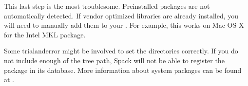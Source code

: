 \documentclass[letterpaper,10pt,english]{sphinxmanual}
\begin{document}
\begin{sphinxVerbatim}[commandchars=\\\{\}]
     
     
   
   
\end{sphinxVerbatim}

This last step is the most troublesome. Pre\sphinxhyphen{}installed packages are not
automatically detected. If vendor optimized libraries are already
installed, you will need to manually add them to your
. For example, this works on Mac OS X
for the Intel MKL package.

\begin{sphinxVerbatim}[commandchars=\\\{\}]
  \PYGZbs{}
           
       
\end{sphinxVerbatim}

Some trial\sphinxhyphen{}and\sphinxhyphen{}error might be involved to set the directories
correctly. If you do not include enough of the tree path, Spack will
not be able to register the package in its database. More information
about system packages can be found at
.
\end{document}
